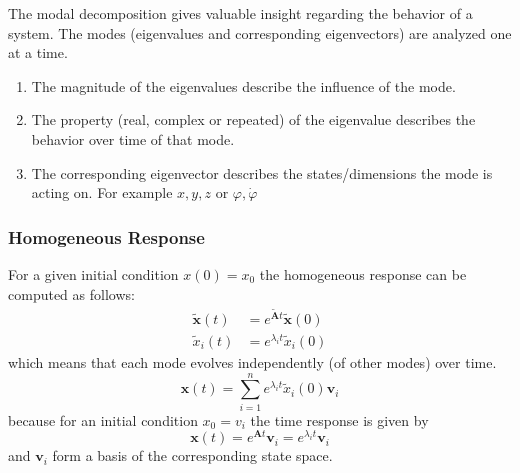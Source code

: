 \begin{examplesection}
    The modal decomposition gives valuable insight regarding the behavior of a system. The modes (eigenvalues and corresponding eigenvectors) are analyzed one at a time.
    \begin{enumerate}
        \item The magnitude of the eigenvalues describe the influence of the mode.
        \item The property (real, complex or repeated) of the eigenvalue describes the behavior over time of that mode.
        \item The corresponding eigenvector describes the states/dimensions the mode is acting on. For example $x,y,z$ or $\varphi, \dot{\varphi}$
    \end{enumerate}
\end{examplesection}

\subsubsection{Homogeneous Response}
For a given initial condition $x(0)=x_0$ the homogeneous response can be computed as follows:\\
\begin{align*}
    \tilde{\mathbf{x}}(t) & =e^{\tilde{\mathbf{A}}t}\tilde{\mathbf{x}}(0) \\
    \tilde{x}_i(t)        & =e^{\lambda_{i}t}\tilde{x}_i(0)
\end{align*}
which means that each mode evolves independently (of other modes) over time.\\
\begin{equation*}
    \mathbf{x}(t)=\sum_{i=1}^{n}e^{\lambda_{i}t}\tilde{x}_i(0)\mathbf{v}_i
\end{equation*}
because for an initial condition $x_0 = v_i$ the time response is given by
\begin{equation*}
    \mathbf{x}(t)=e^{\mathbf{A}t}\mathbf{v}_i=e^{\lambda_{i}t}\mathbf{v}_i
\end{equation*}
and $\mathbf{v}_i$ form a basis of the corresponding state space.

